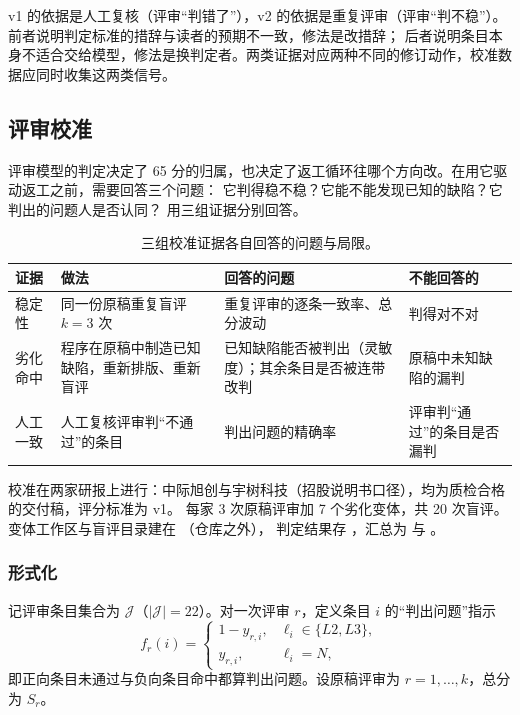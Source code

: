 \begin{insight}[：评分标准改动的两类证据]
v1 的依据是人工复核（评审“判错了”），v2 的依据是重复评审（评审“判不稳”）。前者说明判定标准的措辞与读者的预期不一致，修法是改措辞；
后者说明条目本身不适合交给模型，修法是换判定者。两类证据对应两种不同的修订动作，校准数据应同时收集这两类信号。
\end{insight}

\subsection{评审校准}
\label{sec:eval-calib}

评审模型的判定决定了 65 分的归属，也决定了返工循环往哪个方向改。在用它驱动返工之前，需要回答三个问题：
它判得稳不稳？它能不能发现已知的缺陷？它判出的问题人是否认同？ 用三组证据分别回答。

\begin{table}[t]
\centering
\caption{三组校准证据各自回答的问题与局限。}
\label{tab:eval-calib-design}
\small
\begin{tabularx}{\linewidth}{@{}l X X X@{}}
\toprule
证据 & 做法 & 回答的问题 & 不能回答的 \\
\midrule
稳定性 & 同一份原稿重复盲评 $k=3$ 次 & 重复评审的逐条一致率、总分波动 & 判得对不对 \\
劣化命中 & 程序在原稿中制造已知缺陷，重新排版、重新盲评 & 已知缺陷能否被判出（灵敏度）；其余条目是否被连带改判 & 原稿中未知缺陷的漏判 \\
人工一致 & 人工复核评审判“不通过”的条目 & 判出问题的精确率 & 评审判“通过”的条目是否漏判 \\
\bottomrule
\end{tabularx}
\end{table}

校准在两家研报上进行：中际旭创与宇树科技（招股说明书口径），均为质检合格的交付稿，评分标准为 v1。
每家 3 次原稿评审加 7 个劣化变体，共 20 次盲评。变体工作区与盲评目录建在 （仓库之外），
判定结果存 ，汇总为  与 。

\subsubsection{形式化}

记评审条目集合为 $\mathcal{J}$（$|\mathcal{J}|=22$）。对一次评审 $r$，定义条目 $i$ 的“判出问题”指示
\begin{equation}
\label{eq:eval-flag}
f_r(i)=\begin{cases}1-y_{r,i}, & \ell_i\in\{L2,L3\},\\ y_{r,i}, & \ell_i=N,\end{cases}
\end{equation}
即正向条目未通过与负向条目命中都算判出问题。设原稿评审为 $r=1,\dots,k$，总分为 $S_r$。

